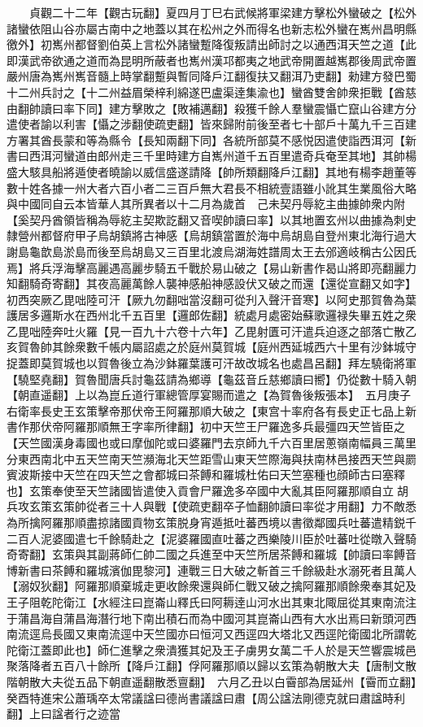　　貞觀二十二年【觀古玩翻】夏四月丁巳右武候將軍梁建方擊松外蠻破之【松外諸蠻依阻山谷亦屬古南中之地蓋以其在松州之外而得名也新志松外蠻在嶲州昌明縣徼外】初嶲州都督劉伯英上言松外諸蠻蹔降復叛請出師討之以通西洱天竺之道【此即漢武帝欲通之道而為昆明所蔽者也嶲州漢邛都夷之地武帝開置越嶲郡後周武帝置嚴州唐為嶲州嶲音髓上時掌翻蹔與暫同降戶江翻復扶又翻洱乃吏翻】勑建方發巴蜀十二州兵討之【十二州益眉榮梓利綿遂巴盧渠逹集渝也】蠻酋雙舍帥衆拒戰【酋慈由翻帥讀曰率下同】建方擊敗之【敗補邁翻】殺獲千餘人羣蠻震懾亡竄山谷建方分遣使者諭以利害【懾之涉翻使疏吏翻】皆來歸附前後至者七十部戶十萬九千三百建方署其酋長蒙和等為縣令【長知兩翻下同】各統所部莫不感悦因遣使詣西洱河【新書曰西洱河蠻道由郎州走三千里時建方自嶲州道千五百里遣奇兵奄至其地】其帥楊盛大駭具船將遁使者曉諭以威信盛遂請降【帥所類翻降戶江翻】其地有楊李趙董等數十姓各據一州大者六百小者二三百戶無大君長不相統壹語雖小訛其生業風俗大略與中國同自云本皆華人其所異者以十二月為歲首　己未契丹辱紇主曲據帥衆内附【奚契丹酋領皆稱為辱紇主契欺訖翻又音喫帥讀曰率】以其地置玄州以曲據為刺史隸營州都督府甲子烏胡鎮將古神感【烏胡鎮當置於海中烏胡島自登州東北海行過大謝島龜歆島淤島而後至烏胡島又三百里北渡烏湖海姓譜周太王去邠適岐稱古公因氏焉】將兵浮海擊高麗遇高麗步騎五千戰於易山破之【易山新書作曷山將即亮翻麗力知翻騎奇寄翻】其夜高麗萬餘人襲神感船神感設伏又破之而還【還從宣翻又如字】　初西突厥乙毘咄陸可汗【厥九勿翻咄當沒翻可從刋入聲汗音寒】以阿史那賀魯為葉護居多邏斯水在西州北千五百里【邏郎佐翻】統處月處密始蘇歌邏禄失畢五姓之衆乙毘咄陸奔吐火羅【見一百九十六卷十六年】乙毘射匱可汗遣兵迫逐之部落亡散乙亥賀魯帥其餘衆數千帳内屬詔處之於庭州莫賀城【庭州西延城西六十里有沙鉢城守捉蓋即莫賀城也以賀魯後立為沙鉢羅葉護可汗故改城名也處昌呂翻】拜左驍衛將軍【驍堅堯翻】賀魯聞唐兵討龜茲請為鄉導【龜茲音丘慈鄉讀曰嚮】仍從數十騎入朝【朝直遥翻】上以為崑丘道行軍總管厚宴賜而遣之【為賀魯後叛張本】　五月庚子右衛率長史王玄策擊帝那伏帝王阿羅那順大破之【東宫十率府各有長史正七品上新書作那伏帝阿羅那順無王字率所律翻】初中天竺王尸羅逸多兵最彊四天竺皆臣之【天竺國漢身毒國也或曰摩伽陀或曰婆羅門去京師九千六百里居蔥嶺南幅員三萬里分東西南北中五天竺南天竺瀕海北天竺距雪山東天竺際海與扶南林邑接西天竺與罽賓波斯接中天竺在四天竺之會都城曰茶餺和羅城杜佑曰天竺塞種也顔師古曰塞釋也】玄策奉使至天竺諸國皆遣使入貢會尸羅逸多卒國中大亂其臣阿羅那順自立胡兵攻玄策玄策帥從者三十人與戰【使疏吏翻卒子恤翻帥讀曰率從才用翻】力不敵悉為所擒阿羅那順盡掠諸國貢物玄策脱身宵遁抵吐蕃西境以書徵鄰國兵吐蕃遣精鋭千二百人泥婆國遣七千餘騎赴之【泥婆羅國直吐蕃之西樂陵川臣於吐蕃吐從暾入聲騎奇寄翻】玄策與其副蔣師仁帥二國之兵進至中天竺所居茶餺和羅城【帥讀曰率餺音博新書曰茶餺和羅城濱伽毘黎河】連戰三日大破之斬首三千餘級赴水溺死者且萬人【溺奴狄翻】阿羅那順棄城走更收餘衆還與師仁戰又破之擒阿羅那順餘衆奉其妃及王子阻乾陀衛江【水經注曰崑崙山釋氏曰阿耨逹山河水出其東北陬屈從其東南流注于蒲昌海自蒲昌海潛行地下南出積石而為中國河其崑崙山西有大水出焉曰新頭河西南流逕烏長國又東南流逕中天竺國亦曰恒河又西逕四大塔北又西逕陀衛國北所謂乾陀衛江蓋即此也】師仁進擊之衆潰獲其妃及王子虜男女萬二千人於是天竺響震城邑聚落降者五百八十餘所【降戶江翻】俘阿羅那順以歸以玄策為朝散大夫【唐制文散階朝散大夫從五品下朝直遥翻散悉亶翻】　六月乙丑以白霫部為居延州【霫而立翻】　癸酉特進宋公蕭瑀卒太常議諡曰德尚書議諡曰肅【周公諡法剛德克就曰肅諡時利翻】上曰諡者行之迹當